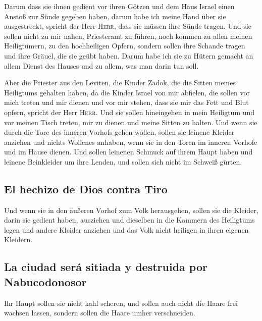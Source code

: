  Darum dass sie ihnen gedient vor ihren Götzen und dem
Haus Israel einen Anstoß zur Sünde gegeben haben, darum habe ich meine
Hand über sie ausgestreckt, spricht der Herr \textsc{Herr}, dass sie
müssen ihre Sünde tragen.  Und sie sollen nicht zu mir
nahen, Priesteramt zu führen, noch kommen zu allen meinen Heiligtümern,
zu den hochheiligen Opfern, sondern sollen ihre Schande tragen und ihre
Gräuel, die sie geübt haben.  Darum habe ich sie zu
Hütern gemacht an allem Dienst des Hauses und zu allem, was man darin
tun soll.

 Aber die Priester aus den Leviten, die Kinder Zadok, die
die Sitten meines Heiligtums gehalten haben, da die Kinder Israel von
mir abfielen, die sollen vor mich treten und mir dienen und vor mir
stehen, dass sie mir das Fett und Blut opfern, spricht der Herr
\textsc{Herr}.  Und sie sollen hineingehen in mein
Heiligtum und vor meinen Tisch treten, mir zu dienen und meine Sitten zu
halten.  Und wenn sie durch die Tore des inneren Vorhofs
gehen wollen, sollen sie leinene Kleider anziehen und nichts Wollenes
anhaben, wenn sie in den Toren im inneren Vorhofe und im Hause dienen.
 Und sollen leinenen Schmuck auf ihrem Haupt haben und
leinene Beinkleider um ihre Lenden, und sollen sich nicht im Schweiß
gürten.

\hypertarget{el-hechizo-de-dios-contra-tiro}{%
\subsection{El hechizo de Dios contra
Tiro}\label{el-hechizo-de-dios-contra-tiro}}

 Und wenn sie in den äußeren Vorhof zum Volk herausgehen,
sollen sie die Kleider, darin sie gedient haben, ausziehen und dieselben
in die Kammern des Heiligtums legen und andere Kleider anziehen und das
Volk nicht heiligen in ihren eigenen Kleidern.

\hypertarget{la-ciudad-seruxe1-sitiada-y-destruida-por-nabucodonosor}{%
\subsection{La ciudad será sitiada y destruida por
Nabucodonosor}\label{la-ciudad-seruxe1-sitiada-y-destruida-por-nabucodonosor}}

 Ihr Haupt sollen sie nicht kahl scheren, und sollen auch
nicht die Haare frei wachsen lassen, sondern sollen die Haare umher
verschneiden.

